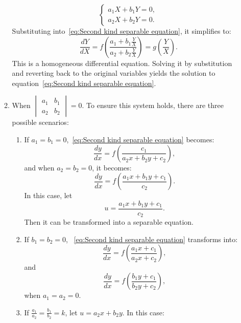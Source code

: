 \documentclass[11pt]{elegantbook}
\begin{document}
\begin{itemize}
\begin{enumerate}
\[\begin{cases}
                a_1X + b_1Y = 0, \\
                a_2X + b_2Y = 0.
                \end{cases}
                \]
                Substituting into~\ref{eq:Second kind separable equation}, it simplifies to:
                \[
                \frac{dY}{dX} 
                = f\left(\frac{a_1 + b_1 \frac{Y}{X}}{a_2 + b_2 \frac{Y}{X}}\right) 
                = g\left(\frac{Y}{X}\right).
                \]
                This is a homogeneous differential equation. 
                Solving it by substitution and reverting back to the original variables 
                yields the solution to equation~\ref{eq:Second kind separable equation}.
            \item When \(\begin{vmatrix} a_1 & b_1 \\ a_2 & b_2 \end{vmatrix} = 0\). 
                To ensure this system holds, there are three possible scenarios:
                \begin{enumerate}
                    \item  If \(a_1 = b_1 = 0\),~\ref{eq:Second kind separable equation} becomes:
                        \[
                        \frac{dy}{dx} = f\left(\frac{c_1}{a_2x + b_2y + c_2}\right),
                        \]
                        and when \(a_2 = b_2 = 0\), it becomes:
                        \[
                        \frac{dy}{dx} = f\left(\frac{a_1x + b_1y + c_1}{c_2}\right).
                        \]
                        In this case, 
                        let
                        \[
                        u = \frac{a_1x + b_1y + c_1}{c_2}.
                        \]
                        Then it can be transformed into a separable equation.
                    \item  If \(b_1 = b_2 = 0\), ~\ref{eq:Second kind separable equation} transforms into:
                        \[
                        \frac{dy}{dx} = f\left(\frac{a_1x + c_1}{a_2x + c_2}\right),
                        \]
                        and
                        \[
                        \frac{dy}{dx} = f\left(\frac{b_1y + c_1}{b_2y + c_2}\right),
                        \]
                        when \(a_1 = a_2 = 0\). 
                    \item If \(\frac{a_1}{a_2} = \frac{b_1}{b_2} = k\), let \(u = a_2x + b_2y\). In this case:
                        \begin{gather*}

\end{gather*}
\end{enumerate}
\end{enumerate}
\end{itemize}
\end{document}

